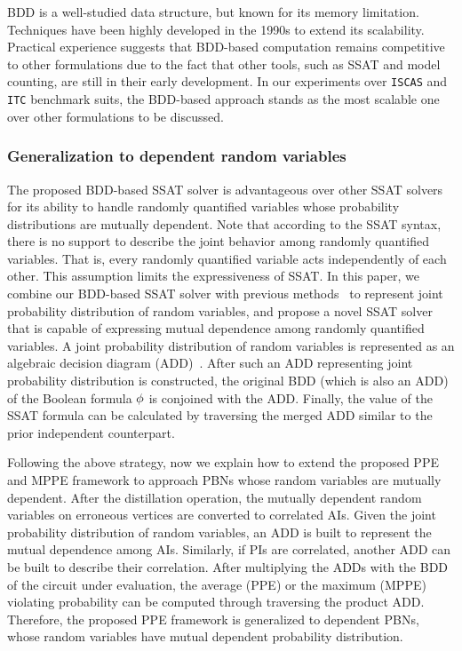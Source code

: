 BDD is a well-studied data structure,
but known for its memory limitation.
Techniques have been highly developed in the 1990s to extend its scalability.
Practical experience suggests that BDD-based computation remains competitive to other formulations
due to the fact that other tools,
such as SSAT and model counting,
are still in their early development.
In our experiments over \texttt{ISCAS} and \texttt{ITC} benchmark suits,
the BDD-based approach stands as the most scalable one over other formulations to be discussed.

\subsubsection{Generalization to dependent random variables}
The proposed BDD-based SSAT solver is advantageous over other SSAT solvers for its ability to handle randomly quantified variables whose probability distributions are mutually dependent.
Note that according to the SSAT syntax,
there is no support to describe the joint behavior among randomly quantified variables.
That is, every randomly quantified variable acts independently of each other.
This assumption limits the expressiveness of SSAT.
In this paper, we combine our BDD-based SSAT solver with previous methods~\cite{Marculescu1998,Miskov-Zivanov2006}
to represent joint probability distribution of random variables,
and propose a novel SSAT solver that is capable of expressing mutual dependence among randomly quantified variables.
A joint probability distribution of random variables is represented as an algebraic decision diagram (ADD)~\cite{Marculescu1998,Miskov-Zivanov2006}.
After such an ADD representing joint probability distribution is constructed,
the original BDD (which is also an ADD) of the Boolean formula $\phi$ is conjoined with the ADD.
Finally, the value of the SSAT formula can be calculated by traversing the merged ADD similar to the prior independent counterpart.

Following the above strategy,
now we explain how to extend the proposed PPE and MPPE framework to approach PBNs whose random variables are mutually dependent.
After the distillation operation,
the mutually dependent random variables on erroneous vertices are converted to correlated AIs.
Given the joint probability distribution of random variables,
an ADD is built to represent the mutual dependence among AIs.
Similarly, if PIs are correlated,
another ADD can be built to describe their correlation.
After multiplying the ADDs with the BDD of the circuit under evaluation,
the average (PPE) or the maximum (MPPE) violating probability can be computed through traversing the product ADD.
Therefore, the proposed PPE framework is generalized to dependent PBNs,
whose random variables have mutual dependent probability distribution.

